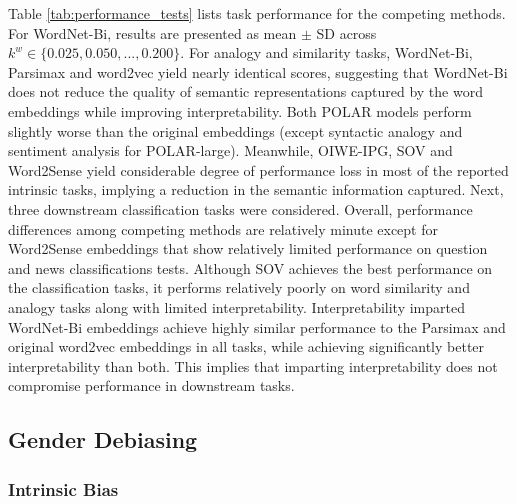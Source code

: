 \documentclass[11pt,a4paper]{article}
\begin{document}
Table \ref{tab:performance_tests} lists task performance for the competing methods.
For WordNet-Bi, results are presented as mean $\pm$ SD across $k^w \in \{0.025,0.050,...,0.200\}$. For analogy and similarity tasks, WordNet-Bi, Parsimax and word2vec yield nearly identical scores, suggesting that WordNet-Bi does not reduce the quality of semantic representations captured by the word embeddings while improving interpretability. Both POLAR models perform slightly worse than the original embeddings (except syntactic analogy and sentiment analysis for POLAR-large). Meanwhile, OIWE-IPG, SOV and Word2Sense yield considerable degree of performance loss in most of the reported intrinsic tasks, implying a reduction in the semantic information captured. Next, three downstream classification tasks were considered. Overall, performance differences among competing methods are relatively minute except for Word2Sense embeddings that show relatively limited performance on question and news classifications tests. Although SOV \citep{faruqui15sparse} achieves the best performance on the classification tasks, it performs relatively poorly on word similarity and analogy tasks along with limited interpretability. Interpretability imparted WordNet-Bi embeddings achieve highly similar performance to the Parsimax and original word2vec embeddings in all tasks, while achieving significantly better interpretability than both. This implies that imparting interpretability does not compromise performance in downstream tasks.  

\subsection{Gender Debiasing}

\subsubsection{Intrinsic Bias}

\end{document}
